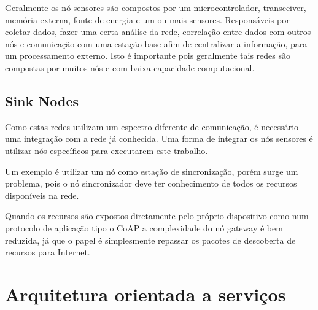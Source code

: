 Geralmente os n\'o sensores s\~ao compostos por um microcontrolador, transceiver, mem\'oria externa, fonte de energia e um ou mais sensores. Respons\'aveis por coletar dados, fazer uma certa an\'alise da rede, correla\c{c}\~ao entre dados com outros n\'os e comunica\c{c}\~ao com uma esta\c{c}\~ao base afim de centralizar a informa\c{c}\~ao, para um processamento externo. Isto \'e importante pois geralmente tais redes s\~ao compostas por muitos n\'os e com baixa capacidade computacional. \cite{dargie2010fundamentals}

\subsection{Sink Nodes}

Como estas redes utilizam um espectro diferente de comunica\c{c}\~ao, \'e necess\'ario uma integra\c{c}\~ao com a rede j\'a conhecida. Uma forma de integrar os n\'os sensores \'e utilizar n\'os espec\'ificos para executarem este trabalho. 

Um exemplo \'e utilizar um n\'o como esta\c{c}\~ao de sincroniza\c{c}\~ao, por\'em surge um problema, pois o n\'o sincronizador deve ter conhecimento de todos os recursos dispon\'iveis na rede.

Quando os recursos s\~ao expostos diretamente pelo pr\'oprio dispositivo como num protocolo de aplica\c{c}\~ao tipo o CoAP a complexidade do n\'o gateway \'e bem reduzida, j\'a que o papel \'e simplesmente repassar os pacotes de descoberta de recursos para Internet. \cite{Colitti11deintegrating}


%
%

\section{Arquitetura orientada a servi\c{c}os}

